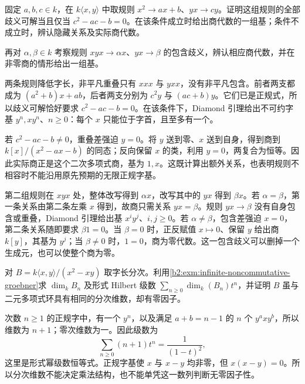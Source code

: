 \begin{optionalexercise}\label{b2:ex:20-diamond-two-failures}
	固定 \(a,b,c\in k\)，在 \(k\langle x,y\rangle\) 中取规则 \(x^2\to ax+b\)、\(yx\to cy\)。证明这组规则的全部歧义可解当且仅当 \(c^2-ac-b=0\)。在该条件成立时给出商代数的一组基；条件不成立时，辨认隐藏关系及实际商代数。

	再对 \(\alpha,\beta\in k\) 考察规则 \(xyx\to\alpha x\)、\(yx\to\beta\) 的包含歧义，辨认相应商代数，并在非零商的情形给出一组基。
\end{optionalexercise}
\begin{solution}
	两条规则降低字长，非平凡重叠只有 \(xxx\) 与 \(yxx\)，没有非平凡包含。前者两支都成为 \((a^2+b)x+ab\)，后者两支分别为 \(c^2y\) 与 \((ac+b)y\)。它们已是正规式，所以歧义可解恰好要求 \(c^2-ac-b=0\)。在该条件下，Diamond 引理给出不可约字基 \(y^n,xy^n\)、\(n\ge0\)：每个 \(x\) 只能位于字首，且至多有一个。

	若 \(c^2-ac-b\ne0\)，重叠差强迫 \(y=0\)。将 \(y\) 送到零、\(x\) 送到自身，得到商到 \(k[x]/(x^2-ax-b)\) 的同态；反向保留 \(x\) 的类，利用 \(y=0\)，两复合为恒等。因此实际商正是这个二次多项式商，基为 \(1,x\)。这既计算出额外关系，也表明规则不相容时不能沿用原先预期的无限正规字基。

	第二组规则在 \(xyx\) 处，整体改写得到 \(\alpha x\)，改写其中的 \(yx\) 得到 \(\beta x\)。若 \(\alpha=\beta\)，第一条关系由第二条左乘 \(x\) 得到，故商只需关系 \(yx=\beta\)。规则 \(yx\to\beta\) 没有自身包含或重叠，Diamond 引理给出基 \(x^iy^j\)、\(i,j\ge0\)。若 \(\alpha\ne\beta\)，包含差强迫 \(x=0\)，第二条关系随即要求 \(\beta1=0\)。当 \(\beta=0\) 时，正反赋值 \(x\mapsto0\)、保留 \(y\) 给出商 \(k[y]\)，其基为 \(y^j\)；当 \(\beta\ne0\) 时，\(1=0\)，商为零代数。这一包含歧义可以删掉一个生成元，也可以使整个商为零。
\end{solution}

\begin{optionalexercise}\label{b2:ex:20-infinite-groebner-growth}
	对 \(B=k\langle x,y\rangle/(x^2-xy)\) 取字长分次。利用\cref{b2:exm:infinite-noncommutative-groebner}求 \(\dim_kB_n\) 及形式 Hilbert 级数 \(\sum_{n\ge0}\dim_k(B_n)t^n\)，并证明 \(B\) 虽与二元多项式环具有相同的分次维数，却有零因子。
\end{optionalexercise}
\begin{solution}
	次数 \(n\ge1\) 的正规字中，有一个 \(y^n\)，以及满足 \(a+b=n-1\) 的 \(n\) 个 \(y^axy^b\)，所以维数为 \(n+1\)；零次维数为一。因此级数为
	\[
		\sum_{n\ge0}(n+1)t^n=\frac1{(1-t)^2},
	\]
	这里是形式幂级数恒等式。正规字基使 \(x\) 与 \(x-y\) 均非零，但 \(x(x-y)=0\)。所以分次维数不能决定乘法结构，也不能单凭这一数列判断无零因子性。
\end{solution}

